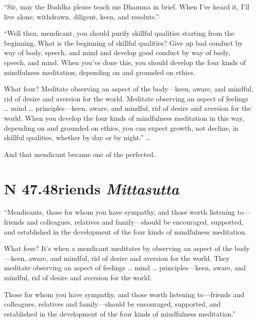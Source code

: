 \documentclass[12pt,openany]{book}%
\newcommand*{\suttatitleacronym}[1]{\smaller[2]{#1}\vspace*{.3em}}
\newcommand*{\suttatitletranslation}[1]{\linebreak{#1}}
\newcommand*{\suttatitleroot}[1]{\linebreak\smaller[2]\itshape{#1}}
\newcommand*{\tocacronym}[1]{\hspace*{-3.3em}{#1}\quad}
\newcommand*{\toctranslation}[1]{#1}
\newcommand*{\tocroot}[1]{(\textit{#1})}
\begin{document}
“Sir, may the Buddha please teach me Dhamma in brief. When I’ve heard it, I’ll live alone, withdrawn, diligent, keen, and resolute.” 

“Well then, mendicant, you should purify skillful qualities starting from the beginning. What is the beginning of skillful qualities? Give up bad conduct by way of body, speech, and mind and develop good conduct by way of body, speech, and mind. When you’ve done this, you should develop the four kinds of mindfulness meditation, depending on and grounded on ethics. 

What four? Meditate observing an aspect of the body—keen, aware, and mindful, rid of desire and aversion for the world. Meditate observing an aspect of feelings … mind … principles—keen, aware, and mindful, rid of desire and aversion for the world. When you develop the four kinds of mindfulness meditation in this way, depending on and grounded on ethics, you can expect growth, not decline, in skillful qualities, whether by day or by night.” … 

And that mendicant became one of the perfected. 

%
\section*{{\suttatitleacronym SN 47.48}{\suttatitletranslation Friends }{\suttatitleroot Mittasutta}}
\addcontentsline{toc}{section}{\tocacronym{SN 47.48} \toctranslation{Friends } \tocroot{Mittasutta}}

“Mendicants, those for whom you have sympathy, and those worth listening to—friends and colleagues, relatives and family—should be encouraged, supported, and established in the development of the four kinds of mindfulness meditation. 

What four? It’s when a mendicant meditates by observing an aspect of the body—keen, aware, and mindful, rid of desire and aversion for the world. They meditate observing an aspect of feelings … mind … principles—keen, aware, and mindful, rid of desire and aversion for the world. 

Those for whom you have sympathy, and those worth listening to—friends and colleagues, relatives and family—should be encouraged, supported, and established in the development of the four kinds of mindfulness meditation.” 
\end{document}
